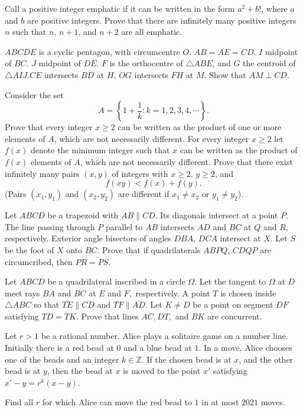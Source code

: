 \documentclass[11pt]{scrartcl}
\begin{document}
\begin{problem}[8807076875709895728]
Call a positive integer emphatic if it can be written in the form $a^2+b!$, where $a$ and $b$ are positive integers. Prove that there are infinitely many positive integers $n$ such that $n$, $n+1$, and $n+2$ are all emphatic.
\end{problem}
\begin{problem}[8811824418974048155]
$ABCDE$ is a cyclic pentagon, with circumcentre $O$. $AB=AE=CD$. $I$ midpoint of $BC$. $J$ midpoint of $DE$. $F$ is the orthocentre of $\triangle ABE$, and $G$ the centroid of $\triangle AIJ$.$CE$ intersects $BD$ at $H$, $OG$ intersects $FH$ at $M$. Show that $AM\perp CD$.
\end{problem}
\begin{problem}[8823022869500312410]
Consider the set
\[A = \left\{1+\frac{1}{k} : k=1,2,3,4,\cdots \right\}.\]
Prove that every integer $x \geq 2$ can be written as the product of one or more elements of $A$, which are not necessarily different.
For every integer $x \geq 2$ let $f(x)$ denote the minimum integer such that $x$ can be written as the
product of $f(x)$ elements of $A$, which are not necessarily different.
Prove that there exist infinitely many pairs $(x,y)$ of integers with $x\geq 2$, $y \geq 2$, and\[f(xy)<f(x)+f(y).\](Pairs $(x_1,y_1)$ and $(x_2,y_2)$ are different if $x_1 \neq x_2$ or $y_1 \neq y_2$).
\end{problem}
\begin{problem}[8840567523125912282]
	Let $ABCD$ be a trapezoid with $AB\parallel CD$. Its diagonals intersect at a point $P$. The line passing through $P$ parallel to $AB$ intersects $AD$ and $BC$ at $Q$ and $R$, respectively. Exterior angle bisectors of angles $DBA$, $DCA$ intersect at $X$. Let $S$ be the foot of $X$ onto $BC$. Prove that if quadrilaterals $ABPQ$, $CDQP$ are circumcribed, then $PR=PS$.
\end{problem}
\begin{problem}[8851048763094130212]
	Let $ABCD$ be a quadrilateral inscribed in a circle $\Omega.$ Let the tangent to $\Omega$ at $D$ meet rays $BA$ and $BC$ at $E$ and $F,$ respectively. A point $T$ is chosen inside $\triangle ABC$ so that $\overline{TE}\parallel\overline{CD}$ and $\overline{TF}\parallel\overline{AD}.$ Let $K\ne D$ be a point on segment $DF$ satisfying $TD=TK.$ Prove that lines $AC,DT,$ and $BK$ are concurrent.
\end{problem}
\begin{problem}[8866273454792491736]
	Let $r>1$ be a rational number. Alice plays a solitaire game on a number line. Initially there is a red bead at $0$ and a blue bead at $1$. In a move, Alice chooses one of the beads and an integer $k \in \mathbb{Z}$. If the chosen bead is at $x$, and the other bead is at $y$, then the bead at $x$ is moved to the point $x'$ satisfying $x'-y=r^k(x-y)$.

Find all $r$ for which Alice can move the red bead to $1$ in at most $2021$ moves.
\end{problem}
\end{document}
